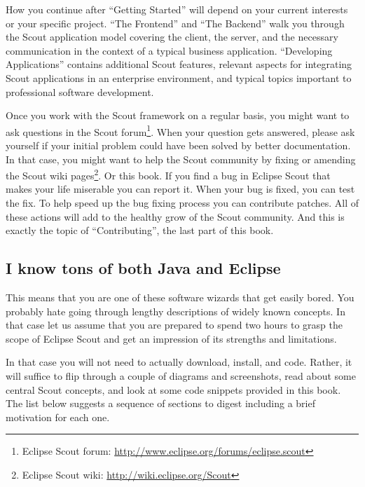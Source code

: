 \documentclass[a4paper,10pt,twoside]{book}
\begin{document}
How you continue after ``Getting Started'' will depend on your current interests or your specific project. 
``The Frontend'' and ``The Backend'' walk you through the Scout application model covering the client, the server, and the necessary communication in the context of a typical business application.
``Developing Applications'' contains additional Scout features, relevant aspects for integrating Scout applications in an enterprise environment, and typical topics important to professional software development.

Once you work with the Scout framework on a regular basis, you might want to ask questions in the Scout 
forum\footnote{Eclipse Scout forum: \url{http://www.eclipse.org/forums/eclipse.scout}}.
When your question gets answered, please ask yourself if your initial problem could have been solved by better documentation.
In that case, you might want to help the Scout community by fixing or amending the Scout wiki pages\footnote{Eclipse Scout wiki: \url{http://wiki.eclipse.org/Scout}}.
Or this book. 
If you find a bug in Eclipse Scout that makes your life miserable you can report it. 
When your bug is fixed, you can test the fix.
To help speed up the bug fixing process you can contribute patches.
All of these actions will add to the healthy grow of the Scout community.
And this is exactly the topic of ``Contributing'', the last part of this book.

\subsection{I know tons of both Java and Eclipse}

This means that you are one of these software wizards that get easily bored.
You probably hate going through lengthy descriptions of widely known concepts.
In that case let us assume that you are prepared to spend two hours to grasp the scope of Eclipse Scout and get an impression of its strengths and limitations.

In that case you will not need to actually download, install, and code. 
Rather, it will suffice to flip through a couple of diagrams and screenshots, read about some central Scout concepts, and look at some code snippets provided in this book.
The list below suggests a sequence of sections to digest including a brief motivation for each one.
\end{document}
